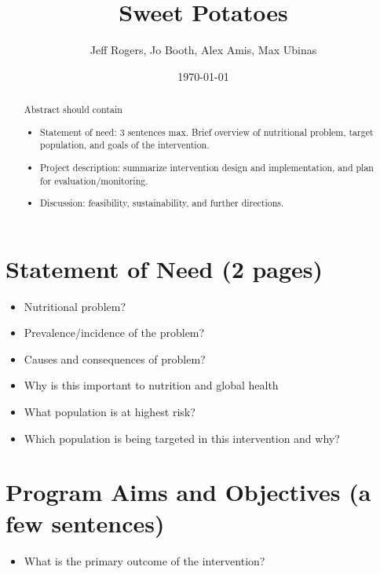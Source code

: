 \documentclass[12pt, letterpaper, draft]{article}
\begin{document}
\title{Sweet Potatoes}
\author{Jeff Rogers, Jo Booth, Alex Amis, Max Ubinas}
\date{\today}
\maketitle


\begin{abstract}
Abstract should contain
\begin{itemize}
    \item Statement of need: 3 sentences max. Brief overview of nutritional
    problem, target population, and goals of the intervention.
    \item Project description: summarize intervention design and implementation,
    and plan for evaluation/monitoring.
    \item Discussion: feasibility, sustainability, and further directions.
\end{itemize}
\end{abstract}

\section{Statement of Need (2 pages)}
\begin{itemize}
    \item Nutritional problem?
    \item Prevalence/incidence of the problem?
    \item Causes and consequences of problem?
    \item Why is this important to nutrition and global health
    \item What population is at highest risk?
    \item Which population is being targeted in this intervention and why?
\end{itemize}

\section{Program Aims and Objectives (a few sentences)}
\begin{itemize}
    \item What is the primary outcome of the intervention?
\end{itemize}
\end{document}
